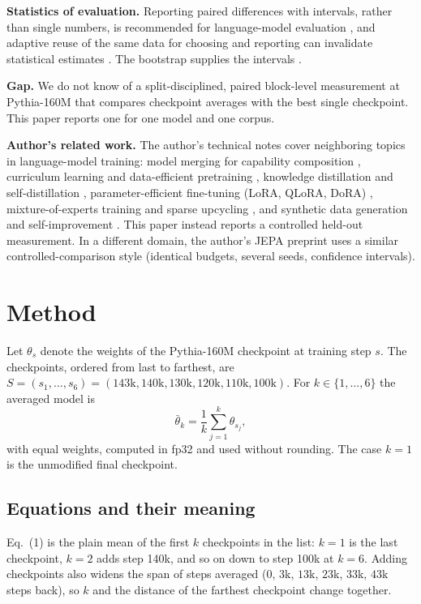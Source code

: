 \documentclass[conference]{IEEEtran}
\begin{document}
\textbf{Statistics of evaluation.} Reporting paired differences with intervals, rather than single numbers, is recommended for language-model evaluation \cite{miller2024errorbars}, and adaptive reuse of the same data for choosing and reporting can invalidate statistical estimates \cite{dwork2014adaptive}. The bootstrap supplies the intervals \cite{efron1979bootstrap}.

\textbf{Gap.} We do not know of a split-disciplined, paired block-level measurement at Pythia-160M that compares checkpoint averages with the best single checkpoint. This paper reports one for one model and one corpus.

\textbf{Author's related work.} The author's technical notes cover neighboring topics in language-model training: model merging for capability composition \cite{santos2026modelmergingfo}, curriculum learning and data-efficient pretraining \cite{santos2026curriculumlear}, knowledge distillation and self-distillation \cite{santos2026knowledgedisti}, parameter-efficient fine-tuning (LoRA, QLoRA, DoRA) \cite{santos2026parametereffic}, mixture-of-experts training and sparse upcycling \cite{santos2026mixtureofexper}, and synthetic data generation and self-improvement \cite{santos2026syntheticdatag}. This paper instead reports a controlled held-out measurement. In a different domain, the author's JEPA preprint \cite{santos2026collapseresist} uses a similar controlled-comparison style (identical budgets, several seeds, confidence intervals).

\section{Method}
Let $\theta_s$ denote the weights of the Pythia-160M checkpoint at training step $s$. The checkpoints, ordered from last to farthest, are
$S=(s_1,\dots,s_6)=(143\mathrm{k},140\mathrm{k},130\mathrm{k},120\mathrm{k},110\mathrm{k},100\mathrm{k})$. For $k\in\{1,\dots,6\}$ the averaged model is
\begin{equation}
\bar\theta_k=\frac{1}{k}\sum_{j=1}^{k}\theta_{s_j},
\end{equation}
with equal weights, computed in fp32 and used without rounding. The case $k=1$ is the unmodified final checkpoint.

\subsection*{Equations and their meaning}
Eq.~(1) is the plain mean of the first $k$ checkpoints in the list: $k=1$ is the last checkpoint, $k=2$ adds step 140k, and so on down to step 100k at $k=6$. Adding checkpoints also widens the span of steps averaged ($0$, $3$k, $13$k, $23$k, $33$k, $43$k steps back), so $k$ and the distance of the farthest checkpoint change together.
\end{document}
